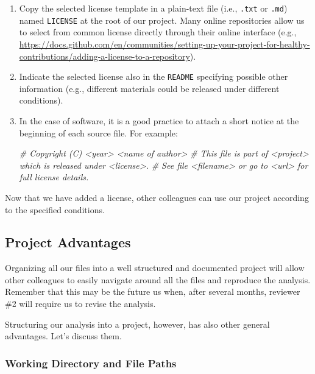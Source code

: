 \documentclass[
  11pt,
]{book}
\newenvironment{Shaded}{\begin{snugshade}}{\end{snugshade}}
\newcommand{\CommentTok}[1]{\textcolor[rgb]{0.56,0.35,0.01}{\textit{#1}}}
\begin{document}
\begin{enumerate}
\def\labelenumi{\arabic{enumi}.}
\item
  Copy the selected license template in a plain-text file (i.e., \texttt{.txt} or \texttt{.md}) named \texttt{LICENSE} at the root of our project. Many online repositories allow us to select from common license directly through their online interface (e.g., \url{https://docs.github.com/en/communities/setting-up-your-project-for-healthy-contributions/adding-a-license-to-a-repository}).
\item
  Indicate the selected license also in the \texttt{README} specifying possible other information (e.g., different materials could be released under different conditions).
\item
  In the case of software, it is a good practice to attach a short notice at the beginning of each source file. For example:

\begin{Shaded}
\begin{Highlighting}[]
\CommentTok{\# Copyright (C) \textless{}year\textgreater{}  \textless{}name of author\textgreater{}}
\CommentTok{\# This file is part of \textless{}project\textgreater{} which is released under \textless{}license\textgreater{}.}
\CommentTok{\# See file \textless{}filename\textgreater{} or go to \textless{}url\textgreater{} for full license details.}
\end{Highlighting}
\end{Shaded}
\end{enumerate}

Now that we have added a license, other colleagues can use our project according to the specified conditions.

\hypertarget{project-advantages}{%
\subsection{Project Advantages}\label{project-advantages}}

Organizing all our files into a well structured and documented project will allow other colleagues to easily navigate around all the files and reproduce the analysis. Remember that this may be the future us when, after several months, reviewer \#2 will require us to revise the analysis.

Structuring our analysis into a project, however, has also other general advantages. Let's discuss them.

\hypertarget{wd-file-path}{%
\subsubsection{Working Directory and File Paths}\label{wd-file-path}}
\end{document}
